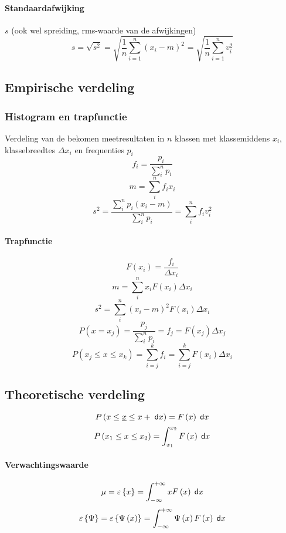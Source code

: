       \paragraph{Standaardafwijking} $s$ (ook wel spreiding, rms-waarde van de afwijkingen)
      \label{sec:stdDev}
        \[
          s = \sqrt{s^2} = \sqrt{\frac{1}{n} \sum^n_{i=1} \left(x_i - m\right)^2} = \sqrt{\frac{1}{n} \sum^n_{i=1} v_i^2}
        \]  
  
  \subsection{Empirische verdeling}
  \label{sec:EmpVerdeling}
    
    \subsubsection{Histogram en trapfunctie}
    \label{sec:Histogram}
      Verdeling van de bekomen meetresultaten in $n$ klassen met klassemiddens $x_i$, klassebreedtes $\Delta x_i$ en frequenties $p_i$
      \[
        f_i = \frac{p_i}{\sum_i^n p_i}
      \]
      \[
        m = \sum_i^n f_i x_i
      \]
      \[
        s^2 = \frac{\sum_i^n p_i\left(x_i - m\right)}{\sum_i^n p_i} = \sum_i^n f_i v_i^2
      \]
      \paragraph{Trapfunctie}
      \label{sec:trapfunctie}
      \[
        F\left(x_i\right) = \frac{f_i}{\Delta x_i}
      \]
      \[
        m = \sum_i^n x_i F\left(x_i\right) \Delta x_i
      \]
      \[
        s^2 = \sum_i^n \left(x_i-m\right)^2F\left(x_i\right)\Delta x_i
      \]
      \[
        P\left(x = x_j\right) = \frac{p_j}{\sum_i^n p_i} = f_j = F\left(x_j\right)\Delta x_j
      \]
      \[
        P\left(x_j \leq x \leq x_k\right) = \sum_{i=j}^k f_i = \sum_{i=j}^k F\left(x_i\right)\Delta x_i
      \]
    
  \subsection{Theoretische verdeling}
  \label{sec:theorVerdeling}
    \[
      P\left(x \leq \underline{x} \leq x +\;\textsf{d}x\right) = F\left(x\right)\;\textsf{d}x
    \]
    \[
      P\left(x_1 \leq x \leq x_2\right) = \int_{x_1}^{x_2} F\left(x\right)\;\textsf{d}x
    \]
      \paragraph{Verwachtingswaarde}
        \[
          \mu = \varepsilon\left\{x\right\} = \int_{- \infty}^{+ \infty} x F\left(x\right) \;\textsf{d}x
        \]
        \[
          \varepsilon\left\{\Psi\right\} = \varepsilon\left\{\Psi\left(x\right)\right\} = \int_{- \infty}^{+ \infty} \Psi\left(x\right) F\left(x\right) \;\textsf{d}x
        \]
